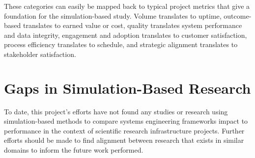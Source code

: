 These categories can easily be mapped back to typical project metrics that give a foundation for the simulation-based study. 
Volume translates to uptime, outcome-based translates to earned value or cost, quality translates system performance and data integrity, engagement and adoption translates to customer satisfaction, process efficiency translates to schedule, and strategic alignment translates to stakeholder satisfaction.
\section{Gaps in Simulation-Based Research}
\label{sect:simulations}
To date, this project's efforts have not found any studies or research using simulation-based methods to compare systems engineering frameworks impact to performance in the context of scientific research infrastructure projects. 
Further efforts should be made to find alignment between research that exists in similar domains to inform the future work performed.